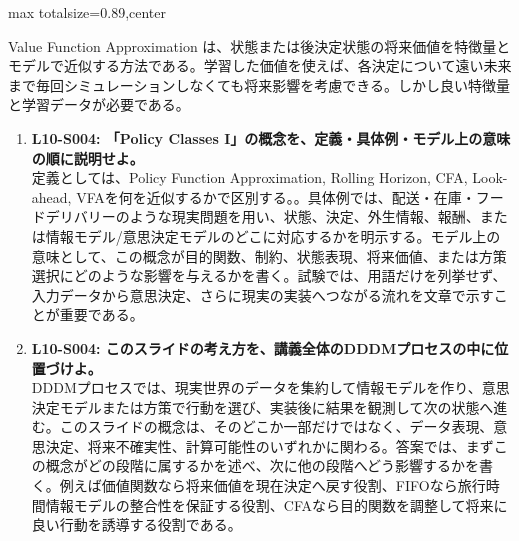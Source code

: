 \begin{minipage}[t]{0.58\textwidth}
\begin{adjustbox}{max totalsize={\textwidth}{0.89\textheight},center}
\begin{minipage}{\textwidth}
Value Function Approximation は、状態または後決定状態の将来価値を特徴量とモデルで近似する方法である。学習した価値を使えば、各決定について遠い未来まで毎回シミュレーションしなくても将来影響を考慮できる。しかし良い特徴量と学習データが必要である。\par{}\begin{enumerate}\item \textbf{L10-S004: 「Policy Classes I」の概念を、定義・具体例・モデル上の意味の順に説明せよ。}\\定義としては、Policy Function Approximation, Rolling Horizon, CFA, Look-ahead, VFAを何を近似するかで区別する。。具体例では、配送・在庫・フードデリバリーのような現実問題を用い、状態、決定、外生情報、報酬、または情報モデル/意思決定モデルのどこに対応するかを明示する。モデル上の意味として、この概念が目的関数、制約、状態表現、将来価値、または方策選択にどのような影響を与えるかを書く。試験では、用語だけを列挙せず、入力データから意思決定、さらに現実の実装へつながる流れを文章で示すことが重要である。\item \textbf{L10-S004: このスライドの考え方を、講義全体のDDDMプロセスの中に位置づけよ。}\\DDDMプロセスでは、現実世界のデータを集約して情報モデルを作り、意思決定モデルまたは方策で行動を選び、実装後に結果を観測して次の状態へ進む。このスライドの概念は、そのどこか一部だけではなく、データ表現、意思決定、将来不確実性、計算可能性のいずれかに関わる。答案では、まずこの概念がどの段階に属するかを述べ、次に他の段階へどう影響するかを書く。例えば価値関数なら将来価値を現在決定へ戻す役割、FIFOなら旅行時間情報モデルの整合性を保証する役割、CFAなら目的関数を調整して将来に良い行動を誘導する役割である。\end{enumerate}
\end{minipage}
\end{adjustbox}
\end{minipage}


